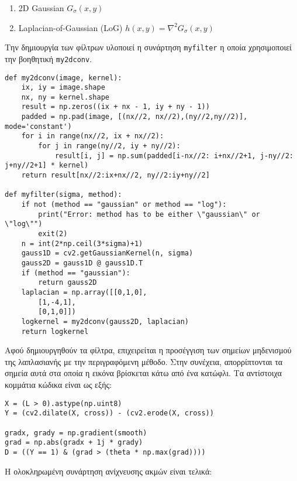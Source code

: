 \documentclass{article}
\newcommand{\eng}[1]{\foreignlanguage{english}{#1}}
\begin{document}
\begin{enumerate}
    \item \eng{2D Gaussian} $G_{\sigma}(x, y)$
    \item\eng{ Laplacian-of-Gaussian (LoG)}  $h(x, y) = \nabla^2 G_{\sigma}(x, y)$
\end{enumerate}

Την δημιουργία των φίλτρων υλοποιεί η συνάρτηση \eng{\texttt{myfilter}} η οποία χρησιμοποιεί την βοηθητική \eng{\texttt{my2dconv}}.

\begin{lstlisting}[breaklines=true, showstringspaces=false]
def my2dconv(image, kernel):
    ix, iy = image.shape
    nx, ny = kernel.shape
    result = np.zeros((ix + nx - 1, iy + ny - 1))
    padded = np.pad(image, [(nx//2, nx//2),(ny//2,ny//2)], mode='constant')
    for i in range(nx//2, ix + nx//2):
        for j in range(ny//2, iy + ny//2):
            result[i, j] = np.sum(padded[i-nx//2: i+nx//2+1, j-ny//2: j+ny//2+1] * kernel)
    return result[nx//2:ix+nx//2, ny//2:iy+ny//2]

def myfilter(sigma, method):
    if not (method == "gaussian" or method == "log"):
        print("Error: method has to be either \"gaussian\" or \"log\"")
        exit(2)
    n = int(2*np.ceil(3*sigma)+1)
    gauss1D = cv2.getGaussianKernel(n, sigma)
    gauss2D = gauss1D @ gauss1D.T
    if (method == "gaussian"):
        return gauss2D
    laplacian = np.array([[0,1,0],
        [1,-4,1],
        [0,1,0]])
    logkernel = my2dconv(gauss2D, laplacian)
    return logkernel
\end{lstlisting}

Αφού δημιουργηθούν τα φίλτρα, επιχειρείται η προσέγγιση των σημείων μηδενισμού της λαπλασιανής με την περιγραφόμενη μέθοδο. Στην συνέχεια, απορρίπτονται τα σημεία αυτά στα οποία η εικόνα βρίσκεται κάτω από ένα κατώφλι. Τα αντίστοιχα κομμάτια κώδικα είναι ως εξής:

\begin{lstlisting}[breaklines=true, showstringspaces=false]
X = (L > 0).astype(np.uint8)
Y = (cv2.dilate(X, cross)) - (cv2.erode(X, cross))

gradx, grady = np.gradient(smooth)
grad = np.abs(gradx + 1j * grady)
D = ((Y == 1) & (grad > (theta * np.max(grad))))
\end{lstlisting}

Η ολοκληρωμένη συνάρτηση ανίχνευσης ακμών είναι τελικά:
\end{document}
